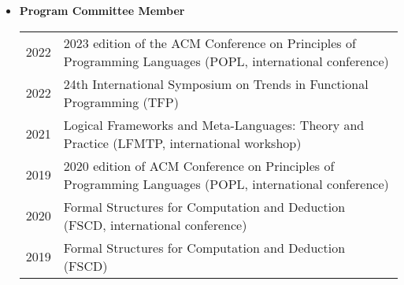 \documentclass[10pt]{article}
\begin{document}
\begin{itemize}

\item[] \textbf{Program Committee Member}
\\[1.3ex]
\begin{tabular}{l@{\quad\ }p{34em}} 
 2022 & 2023 edition of the ACM Conference on Principles of Programming Languages (POPL, international conference)
 \\[.5ex]
 2022 & 24th International Symposium on Trends in Functional Programming (TFP)
 \\[.5ex]
  2021 & Logical Frameworks and Meta-Languages: Theory and Practice (LFMTP, international workshop)
   \\[.5ex]
 2019 & 2020 edition of ACM Conference on Principles of Programming Languages (POPL, international conference)
 \\[.5ex]
 2020 & Formal Structures for Computation and Deduction (FSCD, international conference)
 \\[.5ex]
 2019 & Formal Structures for Computation and Deduction (FSCD)
 \\[.5ex]

\end{tabular}


\end{itemize}
\end{document}
